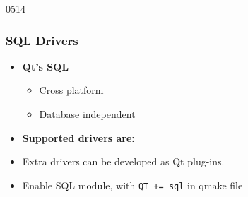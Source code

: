 \begin{slide}{0514}\frametitle{SQL Drivers}
\begin{itemize}
\item \textbf{Qt's SQL}
  \begin{itemize}
  \item Cross platform
  \item Database independent
  \end{itemize}
\item \textbf{Supported drivers are:}
  \begin{multicols}{2}

     \begin{itemize}
      \end{itemize}
   \end{multicols}
\end{itemize}
\begin{itemize}
\item Extra drivers can be developed as Qt plug-ins.
\item Enable SQL module, with \texttt{QT += sql} in qmake file
\end{itemize}
 

\end{slide}

